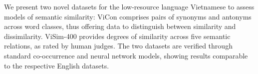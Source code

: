 We present two novel datasets for the low-resource language Vietnamese to assess models of semantic similarity: ViCon comprises pairs of synonyms and antonyms across word classes, thus offering data to distinguish between similarity and dissimilarity. ViSim-400 provides degrees of similarity across five semantic relations, as rated by human judges. The two datasets are verified through standard co-occurrence and neural network models, showing results comparable to the respective English datasets.
